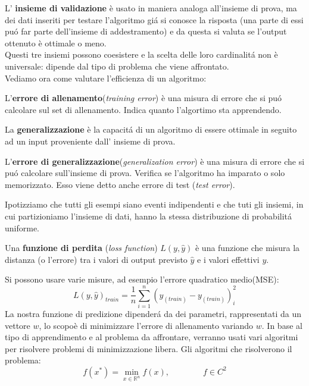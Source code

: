 \documentclass[a4paper,12pt]{report}
\begin{document}
L' \textbf{insieme di validazione} \`e usato in maniera analoga all'insieme di prova, ma dei dati inseriti per testare l'algoritmo gi\'{a} si conosce la risposta (una parte di essi pu\'{o} far parte dell'insieme di addestramento) e da questa si valuta se l'output ottenuto \`e ottimale o meno.\\
Questi tre insiemi possono coesistere e la scelta delle loro cardinalit\'{a} non \`e universale: dipende dal tipo di problema che viene affrontato.\\
Vediamo ora come valutare l'efficienza di un algoritmo:
\begin{defin}
L'\textbf{errore di allenamento}(\textit{training error}) \`e una misura di errore che si pu\'{o} calcolare sul set di allenamento. Indica quanto l'algortimo sta apprendendo.
\end{defin}
\begin{defin}
La \textbf{generalizzazione} \`e la capacit\'{a} di un algoritmo di essere ottimale in seguito ad un input proveniente dall' insieme di prova.
\end{defin}
\begin{defin}
L'\textbf{errore di generalizzazione}(\textit{generalization error}) \`e una misura di errore che si pu\'{o} calcolare sull'insieme di prova. Verifica se l'algoritmo ha imparato o solo memorizzato.
Esso viene detto anche errore di test (\textit{test error}).
\end{defin}
Ipotizziamo che tutti gli esempi siano eventi indipendenti e che tuti gli insiemi, in cui partizioniamo l'insieme di dati, hanno la stessa distribuzione di probabilit\'{a} uniforme.
\begin{defin}
Una \textbf{funzione di perdita} (\textit{loss function}) $L(y,\hat{y})$ \`e una funzione che misura la distanza (o l'errore) tra i valori di output previsto $\hat{y}$ e i valori effettivi ${y}$.
\end{defin}
Si possono usare varie misure, ad esempio l'errore quadratico medio(MSE):
\begin{equation}\label{train-error}
L(y,\hat{y})_{train}=\frac{1}{n}\sum_{i=1}^{n}(\hat{y}_{(train)}-y_{(train)})_{i}^2
\end{equation}
La nostra funzione di predizione dipender\'{a} da dei parametri, rappresentati da un vettore $w$, lo scopo\`e di minimizzare l'errore di allenamento variando $w$.
In base al tipo di apprendimento e al problema da affrontare, verranno usati vari algoritmi per risolvere problemi di minimizzazione libera. Gli algoritmi che risolverono il problema:
\begin{equation}\label{minimi}
f(x^{*})=\min_{x\in \mathbb{R}^{n}}f(x),\qquad \qquad f\in C^{2}
\end{equation}
\end{document}
